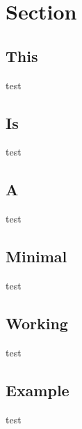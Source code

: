 \documentclass{beamer}
\begin{document}
\section{Section}
\subsection{This}
\begin{frame}{test}
\end{frame}
\subsection{Is}
\begin{frame}
\tableofcontents[subsectionstyle=show/shaded]
\end{frame}
\begin{frame}{test}
\end{frame}
\subsection{A}
\begin{frame}{test}
\end{frame}
\subsection{Minimal}
\begin{frame}{test}
\end{frame}
\subsection{Working}
\begin{frame}{test}
\end{frame}
\subsection{Example}
\begin{frame}{test}
\end{frame}
\end{document}
